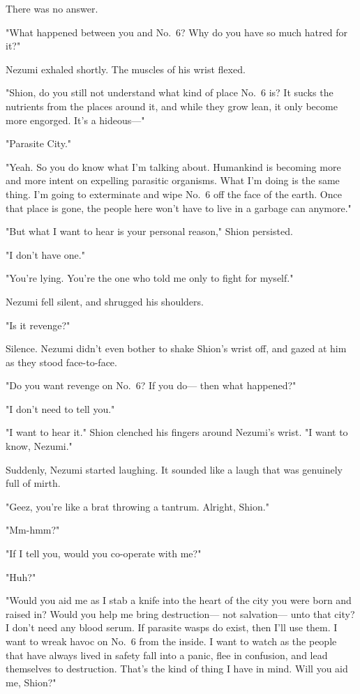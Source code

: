There was no answer.

"What happened between you and No.~6? Why do you have so much hatred for
it?"

Nezumi exhaled shortly. The muscles of his wrist flexed.

"Shion, do you still not understand what kind of place No.~6 is? It
sucks the nutrients from the places around it, and while they grow lean,
it only become more engorged. It's a hideous---"

"Parasite City."

"Yeah. So you do know what I'm talking about. Humankind is becoming more
and more intent on expelling parasitic organisms. What I'm doing is the
same thing. I'm going to exterminate and wipe No.~6 off the face of the
earth. Once that place is gone, the people here won't have to live in a
garbage can anymore."

"But what I want to hear is your personal reason," Shion persisted.

"I don't have one."

"You're lying. You're the one who told me only to fight for myself."

Nezumi fell silent, and shrugged his shoulders.

"Is it revenge?"

Silence. Nezumi didn't even bother to shake Shion's wrist off, and gazed
at him as they stood face-to-face.

"Do you want revenge on No.~6? If you do--- then what happened?"

"I don't need to tell you."

"I want to hear it." Shion clenched his fingers around Nezumi's wrist.
"I want to know, Nezumi."

Suddenly, Nezumi started laughing. It sounded like a laugh that was
genuinely full of mirth.

"Geez, you're like a brat throwing a tantrum. Alright, Shion."

"Mm-hmm?"

"If I tell you, would you co-operate with me?"

"Huh?"

"Would you aid me as I stab a knife into the heart of the city you were
born and raised in? Would you help me bring destruction--- not salvation---
unto that city? I don't need any blood serum. If parasite wasps do
exist, then I'll use them. I want to wreak havoc on No.~6 from the
inside. I want to watch as the people that have always lived in safety
fall into a panic, flee in confusion, and lead themselves to
destruction. That's the kind of thing I have in mind. Will you aid me,
Shion?"

